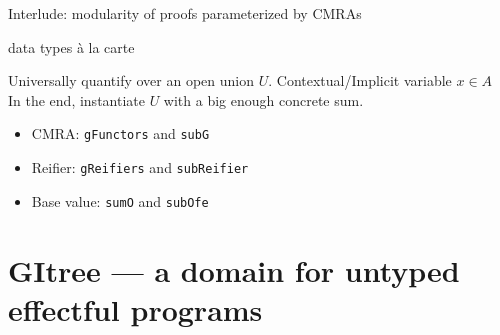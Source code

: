 \documentclass[8pt]{beamer}
\begin{document}
  \begin{frame}{Interlude: modularity of proofs parameterized by CMRAs}
    \begin{block}{data types \`a la carte}
      Universally quantify over an open union \(U\). Contextual/Implicit variable \(x \in A\)\\
      In the end, instantiate \(U\) with a big enough concrete sum.
    \end{block}

    \begin{exampleblock}{}
      \begin{itemize}
        \item CMRA: \texttt{gFunctors} and \texttt{subG}
        \item Reifier: \texttt{gReifiers} and \texttt{subReifier}
        \item Base value: \texttt{sumO} and \texttt{subOfe}
      \end{itemize}
    \end{exampleblock}
  \end{frame}

  \section{GItree --- a domain for untyped effectful programs}
\end{document}
